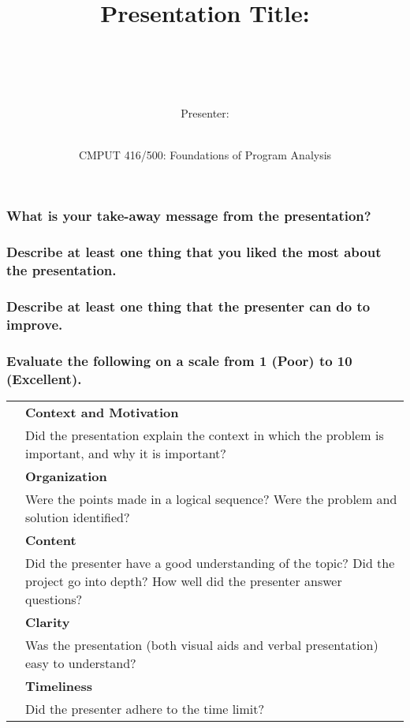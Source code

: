 \documentclass{article}
\title{Presentation Title: ~~~~~~~~~~~~~~~~~~~~~~~~~~~~~~~~~~~~~~~~~}
\author{Presenter: ~~~~~~~~~~~~~~~~~~~~~~~~~~~~~~~~~~~~~~~~~~~~~~~~~~~~~~~~~~~~~~~~~~~~~~~~}
\date{CMPUT 416/500: Foundations of Program Analysis}
\begin{document}
\maketitle

\subsubsection*{What is your take-away message from the presentation?}
\vspace{2cm}



\subsubsection*{Describe at least one thing that you liked the most about the presentation.}
\vspace{3cm}



\subsubsection*{Describe at least one thing that the presenter can do to improve.}
\vspace{3cm}


\subsubsection*{Evaluate the following on a scale from 1 (Poor) to 10 (Excellent).}

\begin{table}[h]
\begin{tabularx}{\textwidth}{| p{1cm} | X |}
	\hline
	& \textbf{Context and Motivation} \\
	& Did the presentation explain the context in which the problem is important, and why it is important? \\ \hline
	& \textbf{Organization} \\ 
	& Were the points made in a logical sequence? Were the problem and solution identified? \\ \hline
	& \textbf{Content} \\ 
	& Did the presenter have a good understanding of the topic? Did the project go into depth? How well did the presenter answer questions? \\ \hline
	& \textbf{Clarity} \\ 
	& Was the presentation (both visual aids and verbal presentation) easy to understand? \\ \hline
	& \textbf{Timeliness} \\
	& Did the presenter adhere to the time limit? \\ \hline 
\end{tabularx}
\end{table}
\end{document}
